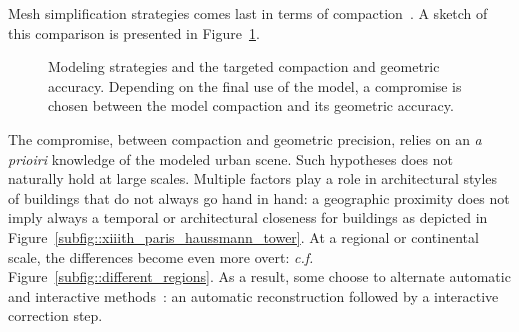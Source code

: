             Mesh simplification strategies comes last in terms of compaction~\parencite{verdie2015lod, zhou20102}.
            A sketch of this comparison is presented in Figure~\ref{fig::modeling_strategies}.\\
            \begin{figure}[htpb]
                \centering
                            
                \caption{
                    \label{fig::modeling_strategies} Modeling strategies and the targeted compaction and geometric accuracy.
                    Depending on the final use of the model, a compromise is chosen between the model compaction and its geometric accuracy.
                }
            \end{figure}
            The compromise, between compaction and geometric precision, relies on an \textit{a prioiri} knowledge of the modeled urban scene.
            Such hypotheses does not naturally hold at large scales.
            Multiple factors play a role in architectural styles of buildings that do not always go hand in hand:
            a geographic proximity does not imply always a temporal or architectural closeness for buildings as depicted in Figure~\ref{subfig::xiiith_paris_haussmann_tower}.
            At a regional or continental scale, the differences become even more overt: \textit{c.f.} Figure~\ref{subfig::different_regions}.
            As a result, some choose to alternate automatic and interactive methods~\parencite{musialski2013survey}: an automatic reconstruction followed by a interactive correction step.
            \begin{figure}[htpb]
            \end{figure}
        
